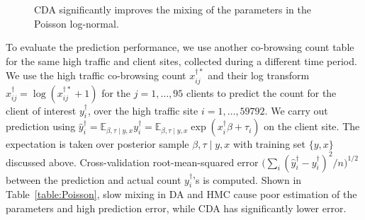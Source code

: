 \documentclass[11pt]{article}
\newcommand{\bb}[1]{\mathbb{#1}}
\begin{document}
\begin{figure}[H]
  {\caption{CDA significantly improves the mixing of the parameters in the Poisson log-normal. \label{data_poisson}}}
  {%
    \qquad
     \qquad
  }
\end{figure}
 






To evaluate the prediction performance, we use another co-browsing count table for the same high traffic and client sites, collected during a different time period. We use the high traffic co-browsing count $x_{ij}^{\dagger*}$ and their log transform 
$x^\dagger_{ij} = \log(   x_{ij}^{\dagger*} +1 )$ for the  $j = 1,\ldots,95$ clients to predict the count for the client of interest $y_i^\dagger$, over the high traffic site $i=1,\ldots, 59792$. We carry out prediction using $\hat y_i^\dagger= \bb E_{ \beta, \tau \mid y,x}   y_{i}^\dagger =\bb E_{ \beta, \tau \mid y,x}\exp(  x_{i}^\dagger\beta + \tau_i)$ on the client site. The expectation is taken over posterior sample $\beta, \tau \mid y,x$ with training set $\{y,x\}$ discussed above. Cross-validation root-mean-squared error $\big(\sum_i(\hat y_i^\dagger - y_i^\dagger)^2/n\big)^{1/2}$ between the prediction and actual count $ y_i^\dagger$'s is computed. Shown in Table~\ref{table:Poisson}, slow mixing in DA and HMC cause poor estimation of the parameters and high prediction error, while CDA has significantly lower error. 
\end{document}
